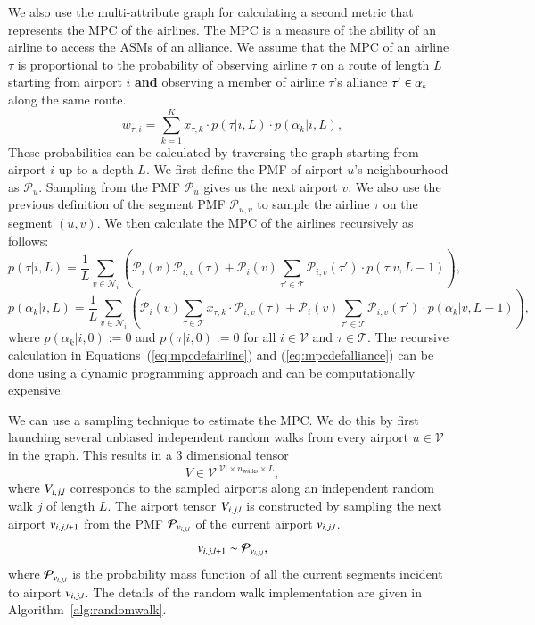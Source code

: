 \documentclass[preprint,times]{elsarticle}
\def\mkhalil#1{{\color{black} #1}}
\begin{document}
We also use the multi-attribute graph for calculating \mkhalil{a} second metric that represents the \acf{MPC} of the airlines. The \ac{MPC} is a measure of the ability of an airline to access the \acp{ASM} of an alliance. We assume that the \ac{MPC} of an airline $\tau$ is proportional to the probability of observing airline $\tau$ on a route of length $L$ starting from \mkhalil{airport} $i$ \textbf{and} observing a \mkhalil{member of airline $\tau$'s} alliance $\mkhalil{\tau'} \in \alpha_k$ along the same route.
%
\begin{equation} \label{eq:mpcdef}
w_{\tau,i} = \sum_{k=1}^{K}x_{\tau,k} \cdot p(\tau | i, L) \cdot p(\alpha_k | i, L),
\end{equation}
%
These probabilities can be calculated by traversing the graph starting from \mkhalil{airport} $i$ up to a depth $L$. We first define the \ac{PMF} of \mkhalil{airport} $u$'s neighbourhood as $\mathcal{P}_u$. Sampling from the \ac{PMF} $\mathcal{P}_u$ gives us the next \mkhalil{airport} $v$. We also use the previous definition of the segment \ac{PMF} $\mathcal{P}_{u,v}$ to sample the airline $\tau$ on the segment $(u,v)$. We then calculate the \ac{MPC} of the airlines recursively as follows:
%
\begin{equation} \label{eq:mpcdefairline}
p(\tau|i,L) = \dfrac{1}{L}\sum_{v\in \mathcal{N}_i}{\left(\mathcal{P}_i(v) \mathcal{P}_{i,v}(\tau) + \mathcal{P}_i(v) \sum_{\tau'\in\mathcal{T}}\mathcal{P}_{i,v}(\tau')\cdot p(\tau|v,L-1) \right)},
\end{equation}
%
\begin{equation} \label{eq:mpcdefalliance}
p(\alpha_k|i,L) = \dfrac{1}{L}\sum_{v\in \mathcal{N}_i}{\left(\mathcal{P}_i(v) \sum_{\tau\in\mathcal{T}}x_{\tau,k}\cdot\mathcal{P}_{i,v}(\tau) + \mathcal{P}_i(v) \sum_{\tau'\in\mathcal{T}}\mathcal{P}_{i,v}(\tau')\cdot p(\alpha_k|v,L-1) \right)},
\end{equation}
%
where $p(\alpha_k|i,0) := 0$ and $p(\tau|i,0) := 0$ for all $i\in\mathcal{V}$ and $\tau\in\mathcal{T}$.
The recursive calculation in Equations~(\ref{eq:mpcdefairline}) and (\ref{eq:mpcdefalliance}) can be done using a dynamic programming approach and can be computationally expensive.


We can use a sampling technique to estimate the \ac{MPC}. We do this by first launching several unbiased independent random walks from every \mkhalil{airport} $u\in\mathcal{V}$ in the graph. This results in a 3 dimensional tensor 
%
\[ {V} \in \mathcal{V}^{\lvert\mathcal{V}\rvert\times n_\text{walks} \times L}, \]
%
where ${V}_{i,j,\mkhalil{l}}$ corresponds to the sampled \mkhalil{airport}s along an independent random walk $j$ of length $L$. The \mkhalil{airport} tensor ${V}_{i,j,\mkhalil{l}}$ is constructed by sampling the next \mkhalil{airport} $v_{i,j,\mkhalil{l}+1}$ from the \ac{PMF} $\mathcal{P}_{v_{i,j,\mkhalil{l}}}$ of the current \mkhalil{airport} $v_{i,j,\mkhalil{l}}$.
%
\[v_{i,j,\mkhalil{l}+1}\sim\mathcal{P}_{v_{i,j,\mkhalil{l}}},\]
%
where $\mathcal{P}_\mkhalil{v_{i,j,{l}}}$ is the probability mass function of all the current \mkhalil{segment}s incident to \mkhalil{airport} $v_{i,j,\mkhalil{l}}$. The details of the random walk implementation are given in Algorithm~\ref{alg:randomwalk}.
\end{document}
